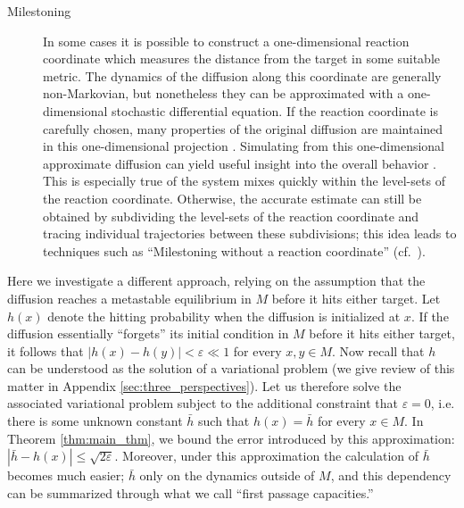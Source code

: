 \documentclass[12pt, nofootinbib,english, amsmath, amssymb, aps, priprint, graphicx,floatfix]{revtex4-1}
\theoremstyle{plain}
\theoremstyle{definition}
\theoremstyle{plain}
\begin{document}
\begin{description}
    \item[Milestoning] In some cases it is possible to construct a one-dimensional reaction coordinate which measures the distance from the target in some suitable metric.  The dynamics of the diffusion along this coordinate are generally non-Markovian, but nonetheless they can be approximated with a one-dimensional stochastic differential equation.  If the reaction coordinate is carefully chosen, many properties of the original diffusion are maintained in this one-dimensional projection \cite{E2006-fm}.  Simulating from this one-dimensional approximate diffusion can yield useful insight into the overall behavior \cite{Bello-Rivas2015-ld}.  This is especially true of the system mixes quickly within the level-sets of the reaction coordinate.  Otherwise, the accurate estimate can still be obtained by subdividing the level-sets of the reaction coordinate and tracing individual trajectories between these subdivisions; this idea leads to techniques such as ``Milestoning without a reaction coordinate'' (cf.\  \cite{Majek2010-uy}).
\end{description}

Here we investigate a different approach, relying on the assumption that the diffusion reaches a metastable equilibrium in $M$ before it hits either target.  Let $h(x)$ denote the hitting probability when the diffusion is initialized at $x$.  If the diffusion essentially ``forgets'' its initial condition in $M$ before it hits either target, it follows that $|h(x)- h(y)|<\varepsilon\ll 1$ for every $x,y\in M$.  Now recall that $h$ can be understood as the solution of a variational problem (we give review of this matter in Appendix \ref{sec:three_perspectives}).  Let us therefore solve the associated variational problem subject to the additional constraint that $\varepsilon=0$, i.e. there is some unknown constant $\bar h$ such that $h(x)=\bar h$ for every $x\in M$.  In Theorem \ref{thm:main_thm}, we bound the error introduced by this approximation: $|\bar h - h(x) |\leq \sqrt{2\varepsilon}$.  Moreover, under this approximation the calculation of $\bar h$ becomes much easier; $\bar h$ only on the dynamics outside of $M$, and this dependency can be summarized through what we call ``first passage capacities.''
\end{document}
